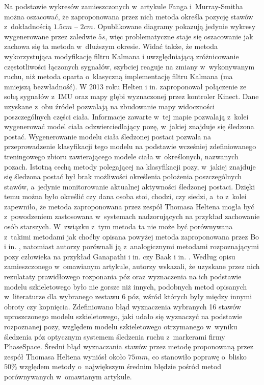 Na podstawie wykresów zamieszczonych w~artykule Fanga i~Murray-Smitha można oszacować, że zaproponowana przez nich metoda określa pozycję stawów z~dokładnością $1.5 cm$ -- $2 cm$. Opublikowane diagramy pokazują jedynie wykresy wygenerowane przez zaledwie $5s$, więc problematyczne staje się oszacowanie jak zachowa się ta metoda w~dłuższym okresie. Widać także, że metoda wykorzystująca modyfikację filtru Kalmana i uwzględniającą zróżnicowanie częstotliwości łączonych sygnałów, szybciej reaguje na zmiany w~wykonywanym ruchu, niż metoda oparta o~klasyczną implementację filtru Kalmana (ma mniejszą bezwładność).																																																	
W 2013 roku Helten i in. \cite{Helten2013} zaproponował połączenie ze sobą sygnałów z~IMU oraz mapy głębi wyznaczonej przez kontroler Kinect. Dane uzyskane z~obu źródeł pozwalają na zbudowanie mapy widoczności poszczególnych części ciała. Informacje zawarte w~tej mapie pozwalają z~kolei wygenerować model ciała odzwierciedlający pozę, w~jakiej znajduje się śledzona postać. Wygenerowanie modelu ciała śledzonej postaci pozwala na przeprowadzenie klasyfikacji tego modelu na podstawie wcześniej zdefiniowanego treningowego zbioru zawierającego modele ciała w~określonych, nazwanych pozach. Istotną cechą metody polegającej na klasyfikacji pozy, w~jakiej znajduje się śledzona postać był brak możliwości określenia położenia poszczególnych stawów, a~jedynie monitorowanie aktualnej aktywności śledzonej postaci. Dzięki temu można było określić czy dana osoba stoi, chodzi, czy siedzi, a~to z~kolei zapewniło, że metoda zaproponowana przez zespół Thomasa Heltena mogła być z~powodzeniem zastosowana w~systemach nadzorujących na przykład zachowanie osób starszych. W~związku z~tym metoda ta nie może być porównywana z~takimi metodami jak choćby opisana powyżej metoda zaproponowana przez Bo i in. \cite{Bo2011a}, natomiast autorzy porównali ją z~analogicznymi metodami rozpoznającymi pozy człowieka na przykład Ganapathi i in. \cite{Ganapathi2010} czy Baak i in. \cite{Baak2011}. Według opisu zamieszczonego w~omawianym artykule, autorzy wskazali, że uzyskane przez nich rezulataty prawidłowego rozponania póz oraz wyznaczenia na ich podstawie modelu szkieletowego było nie gorsze niż innych, podobnych metod opisanych w~literaturze dla wybranego zestawu 6 póz, wśród których były między innymi obroty czy kopnięcia. Zdefiniowano błąd wyznaczenia wybranych 16 stawów uproszczonego modelu szkieletowego, jaki udało się wyznaczyć na podstawie rozpoznanej pozy, względem modelu szkieletowego otrzymanego w~wyniku śledzenia póz optycznym systemem śledzenia ruchu z~markerami firmy PhaseSpace. Średni błąd wyznaczania stawów przez metodę proponowaną przez zespół Thomasa Heltena wyniósł około $75mm$, co stanowiło poprawę o~blisko $50\%$ względem metody o~największym średnim błędzie pośród metod porównywanych w~omawianym artykule.																																																			
